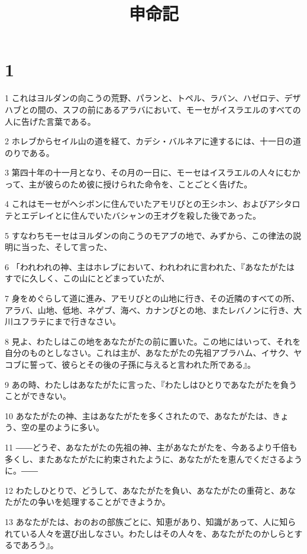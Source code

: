

\title{申命記}


\chapter{1}

\par 1 これはヨルダンの向こうの荒野、パランと、トペル、ラバン、ハゼロテ、デザハブとの間の、スフの前にあるアラバにおいて、モーセがイスラエルのすべての人に告げた言葉である。
\par 2 ホレブからセイル山の道を経て、カデシ・バルネアに達するには、十一日の道のりである。
\par 3 第四十年の十一月となり、その月の一日に、モーセはイスラエルの人々にむかって、主が彼らのため彼に授けられた命令を、ことごとく告げた。
\par 4 これはモーセがヘシボンに住んでいたアモリびとの王シホン、およびアシタロテとエデレイとに住んでいたバシャンの王オグを殺した後であった。
\par 5 すなわちモーセはヨルダンの向こうのモアブの地で、みずから、この律法の説明に当った、そして言った、
\par 6 「われわれの神、主はホレブにおいて、われわれに言われた、『あなたがたはすでに久しく、この山にとどまっていたが、
\par 7 身をめぐらして道に進み、アモリびとの山地に行き、その近隣のすべての所、アラバ、山地、低地、ネゲブ、海べ、カナンびとの地、またレバノンに行き、大川ユフラテにまで行きなさい。
\par 8 見よ、わたしはこの地をあなたがたの前に置いた。この地にはいって、それを自分のものとしなさい。これは主が、あなたがたの先祖アブラハム、イサク、ヤコブに誓って、彼らとその後の子孫に与えると言われた所である』。
\par 9 あの時、わたしはあなたがたに言った、『わたしはひとりであなたがたを負うことができない。
\par 10 あなたがたの神、主はあなたがたを多くされたので、あなたがたは、きょう、空の星のように多い。
\par 11 ――どうぞ、あなたがたの先祖の神、主があなたがたを、今あるより千倍も多くし、またあなたがたに約束されたように、あなたがたを恵んでくださるように。――
\par 12 わたしひとりで、どうして、あなたがたを負い、あなたがたの重荷と、あなたがたの争いを処理することができようか。
\par 13 あなたがたは、おのおの部族ごとに、知恵があり、知識があって、人に知られている人々を選び出しなさい。わたしはその人々を、あなたがたのかしらとするであろう』。
